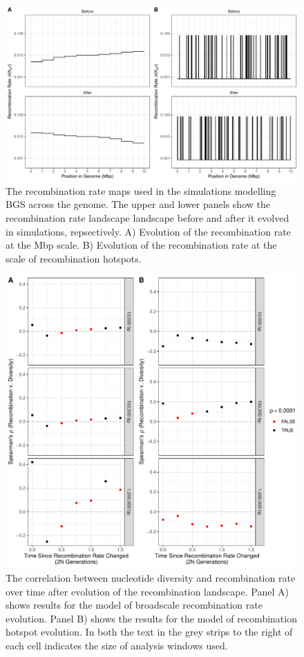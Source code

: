 \documentclass[11pt,twoside, onecolumn]{GSA_format}
\begin{document}
\begin{figure}[h]
\includegraphics[width=\textwidth]{../Plots/recombinationMapDiagram.pdf}
\caption{The recombination rate maps used in the simulations modelling BGS across the genome. The upper and lower panels show the recombination rate landscape landscape before and after it evolved in simulations, repsectively. A) Evolution of the recombination rate at the Mbp scale. B) Evolution of the recombination rate at the scale of recombination hotspots.}
\label{fig:recombinationRateMaps}
\end{figure}



\begin{figure}[h]
\includegraphics[width=\textwidth]{../Plots/pi_r_correlationOverTime_bothMaps_allWindows.pdf}
\caption{The correlation between nucleotide diversity and recombination rate over time after evolution of the recombination landscape. Panel A) shows results for the model of broadscale recombination rate evolution. Panel B) shows the results for the model of recombination hotspot evolution. In both the text in the grey strips to the right of each cell indicates the size of analysis windows used.}
\label{fig:recombinationRateMaps}
\end{figure}
\end{document}
